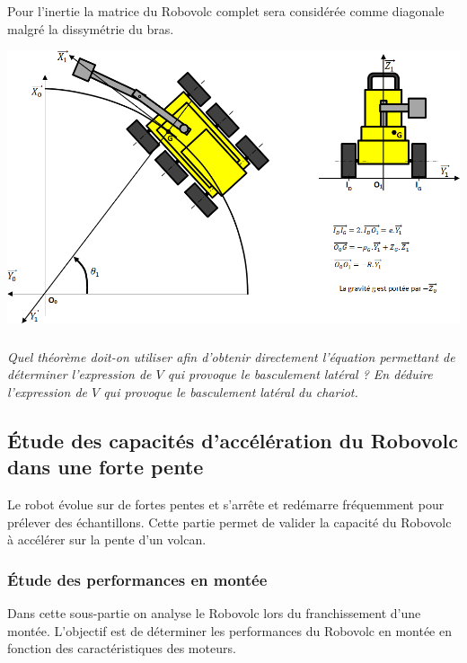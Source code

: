 \documentclass[10pt,fleqn]{article} %
\begin{document}
\begin{multicols}{2}
\begin{hypo}
Pour l’inertie la matrice du Robovolc complet sera considérée comme diagonale malgré la dissymétrie du bras.

\end{hypo}

\begin{center}
\includegraphics[width=\linewidth]{images/fig_06}
\end{center}


\subparagraph{}
\textit{Quel théorème doit-on utiliser afin d’obtenir directement l’équation permettant de déterminer l’expression de $V$ qui provoque le basculement latéral ?
En déduire l’expression de $V$ qui provoque le basculement latéral du chariot.}
\ifprof
\begin{corrige}
\end{corrige}
\else
\fi


\subsection*{Étude des capacités d'accélération du Robovolc dans une forte pente}

Le robot évolue sur de fortes pentes et s’arrête et redémarre fréquemment pour prélever des échantillons. Cette partie permet de valider la capacité du Robovolc à accélérer sur la pente d’un volcan.


\subsubsection*{Étude des performances en montée}
Dans cette sous-partie on analyse le Robovolc lors du franchissement d'une montée.
L'objectif est de déterminer les performances du Robovolc en montée en fonction des caractéristiques des moteurs.


\end{multicols}
\end{document}

